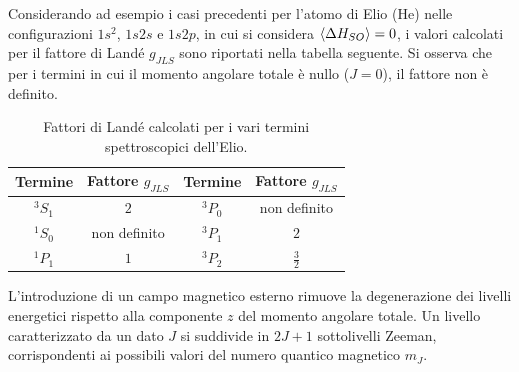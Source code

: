 Considerando ad esempio i casi precedenti per l'atomo di Elio (He) nelle configurazioni \( 1s^2 \), \( 1s 2s \) e \( 1s 2p \), in cui si considera \(\expval{\Delta H_{SO}} = 0\), i valori calcolati per il fattore di Landé \( g_{JLS} \) sono riportati nella tabella seguente. Si osserva che per i termini in cui il momento angolare totale è nullo (\( J=0 \)), il fattore non è definito.

\begin{table}[htbp]
    \centering
    \renewcommand{\arraystretch}{1.5}
    \begin{tabular}{|c|c||c|c|}
        \hline
        \textbf{Termine} & \textbf{Fattore } \( g_{JLS} \) & \textbf{Termine} & \textbf{Fattore } \( g_{JLS} \) \\
        \hline
        \( ^3S_1 \) & \( 2 \) & \( ^3P_0 \) & non definito \\
        \hline
        \( ^1S_0 \) & non definito & \( ^3P_1 \) & \( 2 \) \\
        \hline
        \( ^1P_1 \) & \( 1 \) & \( ^3P_2 \) & \( \frac{3}{2} \) \\
        \hline
    \end{tabular}
    \caption{Fattori di Landé calcolati per i vari termini spettroscopici dell'Elio.}
\end{table}

L'introduzione di un campo magnetico esterno rimuove la degenerazione dei livelli energetici rispetto alla componente \( z \) del momento angolare totale. Un livello caratterizzato da un dato \( J \) si suddivide in \( 2J+1 \) sottolivelli Zeeman, corrispondenti ai possibili valori del numero quantico magnetico \( m_J \).

